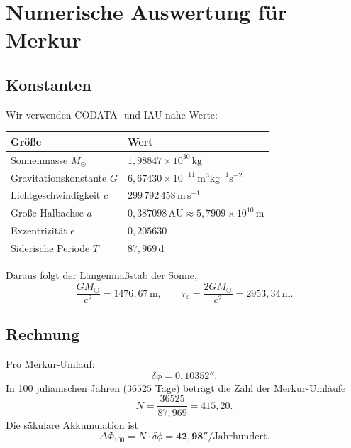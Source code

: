 \documentclass[11pt,a4paper]{article}
\theoremstyle{definition}
\theoremstyle{remark}
\newcommand{\rs}{r_{\mathrm{s}}}
\newcommand{\MS}{M_{\odot}}
\newcommand{\dphi}{\delta\phi}
\begin{document}
\section{Numerische Auswertung für Merkur}

\subsection{Konstanten}

Wir verwenden CODATA- und IAU-nahe Werte:
\begin{center}
\begin{tabular}{@{}ll@{}}
\toprule
Größe & Wert \\
\midrule
Sonnenmasse \(\MS\) & \(1{,}98847\times 10^{30}\,\mathrm{kg}\) \\
Gravitationskonstante \(G\) & \(6{,}67430\times 10^{-11}\,\mathrm{m}^3\mathrm{kg}^{-1}\mathrm{s}^{-2}\) \\
Lichtgeschwindigkeit \(c\) & \(299\,792\,458\,\mathrm{m\,s}^{-1}\) \\
Große Halbachse \(a\) & \(0{,}387098\,\mathrm{AU}\approx 5{,}7909\times 10^{10}\,\mathrm{m}\) \\
Exzentrizität \(e\) & \(0{,}205630\) \\
Siderische Periode \(T\) & \(87{,}969\,\mathrm{d}\) \\
\bottomrule
\end{tabular}
\end{center}

Daraus folgt der Längenmaßstab der Sonne,
\begin{equation}
\frac{G\MS}{c^2}=1476{,}67\,\mathrm{m},\qquad \rs=\frac{2G\MS}{c^2}=2953{,}34\,\mathrm{m}.
\end{equation}

\subsection{Rechnung}

Pro Merkur-Umlauf:
\begin{equation}
\dphi=0{,}10352''.
\end{equation}
In 100 julianischen Jahren (\(36525\) Tage) beträgt die Zahl der Merkur-Umläufe
\begin{equation}
N=\frac{36525}{87{,}969}=415{,}20.
\end{equation}
Die säkulare Akkumulation ist
\begin{equation}
\Delta\Phi_{100}=N\cdot\dphi=\mathbf{42{,}98''}/\mathrm{Jahrhundert}.
\end{equation}
\end{document}
